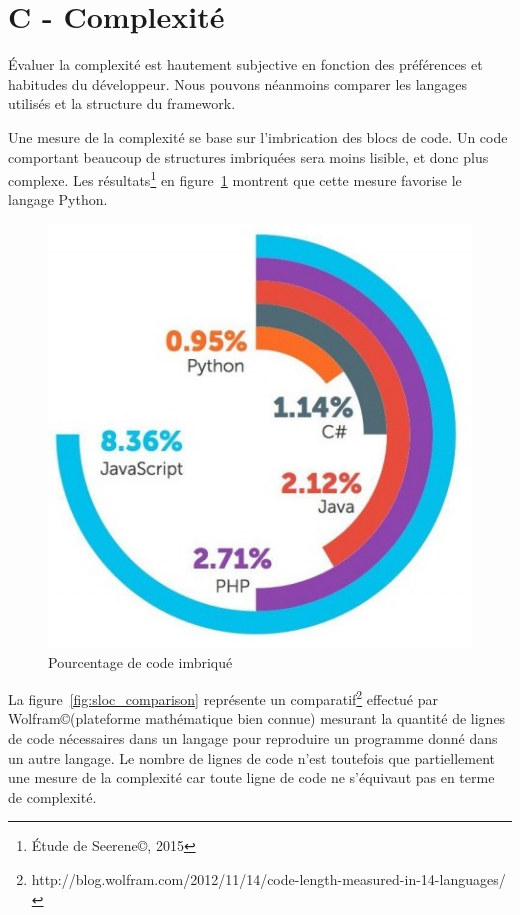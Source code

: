 \documentclass[a4paper, 11pt]{article}
\begin{document}
\section*{C - Complexité}
\'Evaluer la complexité est hautement subjective en fonction des préférences et habitudes du développeur. Nous pouvons néanmoins comparer les langages utilisés et la structure du framework.

Une mesure de la complexité se base sur l'imbrication des blocs de code. Un code comportant beaucoup de structures imbriquées sera moins lisible, et donc plus complexe. Les résultats\footnote{\'Etude de Seerene\copyright, 2015} en figure~\ref{fig:complexity} montrent que cette mesure favorise le langage Python.

\begin{figure}
    \centering
    \includegraphics[width=.6\textwidth]{Etude_Technologique_1/complexity}
    \caption{Pourcentage de code imbriqué}
    \label{fig:complexity}
\end{figure}

La figure~\ref{fig:sloc_comparison} représente un comparatif\footnote{http://blog.wolfram.com/2012/11/14/code-length-measured-in-14-languages/} effectué par Wolfram\copyright (plateforme mathématique bien connue) mesurant la quantité de lignes de code nécessaires dans un langage pour reproduire un programme donné dans un autre langage. Le nombre de lignes de code n'est toutefois que partiellement une mesure de la complexité car toute ligne de code ne s'équivaut pas en terme de complexité.
\end{document}
